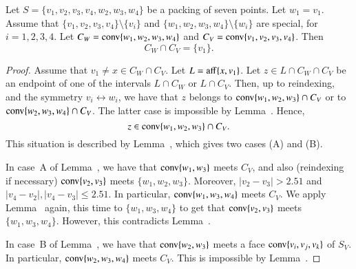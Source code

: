 \begin{tarskidata}
\begin{tarski}
\begin{lemma}
Let $S=\{v_1,v_2,v_3,v_4,w_2,w_3,w_4\}$ be a packing of seven
points.
Let $w_1=v_1$.
Assume that $\{v_1,v_2,v_3,v_4\}\setminus\{v_i\}$ and
$\{w_1,w_2,w_3,w_4\}\setminus\{w_i\}$ are special, for $i=1,2,3,4$.
Let 
   $C_W ={\operatorname{conv}}\{w_1,w_2,w_3,w_4\}$ and
$C_V = {\operatorname{conv}}\{v_1,v_2,v_3,v_4\}$.  
Then
  $$
  C_W \cap C_V = \{v_1\}.
  $$
\end{lemma}

\begin{proof}  Assume that $v_1\ne x\in C_W\cap C_V$.
Let $L={\operatorname{aff}}\{x,v_1\}$.  Let $z\in L\cap C_W\cap C_V$ be an endpoint
of one of the intervals $L\cap C_W$ or $L\cap C_V$.  Then, up
to reindexing, and the symmetry $v_i\leftrightarrow w_i$,  we have
that $z$
belongs to ${\operatorname{conv}}\{w_1,w_2,w_3\}\cap C_V$ or to
${\operatorname{conv}}\{w_2,w_3,w_4\}\cap C_V$.  The latter case is impossible
by Lemma~.  Hence,  
   $$z\in{\operatorname{conv}}\{w_1,w_2,w_3\}\cap C_V.$$  This situation
is described by Lemma~, which gives two cases (A)
and (B). 

In case~A of Lemma~, we have that
${\operatorname{conv}}\{w_1,w_3\}$ meets $C_V$, and also (reindexing if necessary)
${\operatorname{conv}}\{v_2,v_3\}$ meets $\{w_1,w_2,w_3\}$.
Moreover, $|v_2-v_3|>2.51$ and $|v_4-v_2|,|v_4-v_3|\le 2.51$.
In particular, ${\operatorname{conv}}\{w_1,w_3,w_4\}$
meets $C_V$.  We apply Lemma~ again, this
time to $\{w_1,w_3,w_4\}$ to get that ${\operatorname{conv}}\{v_2,v_3\}$ meets
$\{w_1,w_3,w_4\}$.  However, this contradicts Lemma~.

In case~B of Lemma~, 
we have that ${\operatorname{conv}}\{w_2,w_3\}$
meets a face ${\operatorname{conv}}\{v_i,v_j,v_k\}$ of $S_V$.  In particular,
${\operatorname{conv}}\{w_2,w_3,w_4\}$ meets $C_V$.  This is impossible
by Lemma~.
\end{proof}
\end{tarski}





\begin{tarski}


\end{tarski}
\end{tarskidata}
